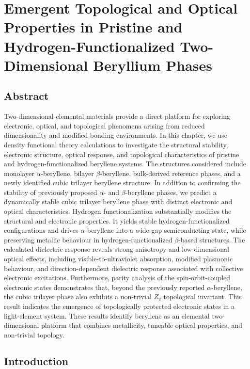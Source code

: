 \chapter[Topological and Optical Properties of Beryllene Phases]{Emergent Topological and Optical Properties in Pristine and Hydrogen-Functionalized Two-Dimensional Beryllium Phases}
\label{cha:project_beryllene}

\section{Abstract}
\label{3_abstract}

Two-dimensional elemental materials provide a direct platform for exploring electronic,
optical,
and topological phenomena arising from reduced dimensionality and modified bonding environments.
In this chapter,
we use density functional theory calculations to investigate the structural stability,
electronic structure,
optical response,
and topological characteristics of pristine and hydrogen-functionalized beryllene systems.
The structures considered include monolayer $\alpha$-beryllene,
bilayer $\beta$-beryllene,
bulk-derived reference phases,
and a newly identified cubic trilayer beryllene structure.
In addition to confirming the stability of previously proposed $\alpha$- and $\beta$-beryllene phases,
we predict a dynamically stable cubic trilayer beryllene phase with distinct electronic and optical characteristics.
Hydrogen functionalization substantially modifies the structural and electronic properties.
It yields stable hydrogen-functionalized configurations and drives $\alpha$-beryllene into a wide-gap semiconducting state,
while preserving metallic behaviour in hydrogen-functionalized $\beta$-based structures.
The calculated dielectric response reveals strong anisotropy and low-dimensional optical effects,
including visible-to-ultraviolet absorption,
modified plasmonic behaviour,
and direction-dependent dielectric response associated with collective electronic excitations.
Furthermore,
parity analysis of the spin-orbit-coupled electronic states demonstrates that,
beyond the previously reported $\alpha$-beryllene,
the cubic trilayer phase also exhibits a non-trivial $Z_{2}$ topological invariant.
This result indicates the emergence of topologically protected electronic states in a light-element system.
These results identify beryllene as an elemental two-dimensional platform that combines metallicity,
tuneable optical properties,
and non-trivial topology.

\section{Introduction}
\label{3_introduction}

